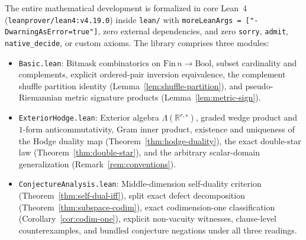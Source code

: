 \documentclass[11pt]{article}
\theoremstyle{definition}
\newcommand{\R}{\mathbb{R}}
\begin{document}
The entire mathematical development is formalized in core Lean~4 (\texttt{leanprover/lean4:v4.19.0}) inside \texttt{lean/} with \texttt{moreLeanArgs = ["-DwarningAsError=true"]}, zero external dependencies, and zero \texttt{sorry}, \texttt{admit}, \texttt{native\_decide}, or custom axioms. The library comprises three modules:
\begin{itemize}
  \item \texttt{Basic.lean}: Bitmask combinatorics on $\mathrm{Fin}\,n \to \mathrm{Bool}$, subset cardinality and complements, explicit ordered-pair inversion equivalence, the complement shuffle partition identity (Lemma~\ref{lem:shuffle-partition}), and pseudo-Riemannian metric signature products (Lemma~\ref{lem:metric-sign}).
  \item \texttt{ExteriorHodge.lean}: Exterior algebra $\Lambda(\R^{r,s})$, graded wedge product and $1$-form anticommutativity, Gram inner product, existence and uniqueness of the Hodge duality map (Theorem~\ref{thm:hodge-duality}), the exact double-star law (Theorem~\ref{thm:double-star}), and the arbitrary scalar-domain generalization (Remark~\ref{rem:conventions}).
  \item \texttt{ConjectureAnalysis.lean}: Middle-dimension self-duality criterion (Theorem~\ref{thm:self-dual-iff}), split exact defect decomposition (Theorem~\ref{thm:subspace-codim}), exact codimension-one classification (Corollary~\ref{cor:codim-one}), explicit non-vacuity witnesses, clause-level counterexamples, and bundled conjecture negations under all three readings.
\end{itemize}
\end{document}
